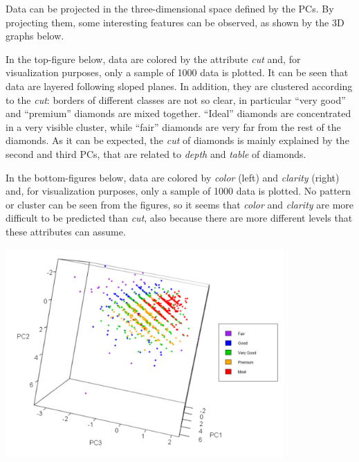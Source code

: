 \documentclass[
]{article}
\begin{document}
Data can be projected in the three-dimensional space defined by the PCs.
By projecting them, some interesting features can be observed, as shown
by the 3D graphs below.

\newpage

In the top-figure below, data are colored by the attribute \emph{cut}
and, for visualization purposes, only a sample of 1000 data is plotted.
It can be seen that data are layered following sloped planes. In
addition, they are clustered according to the \emph{cut}: borders of
different classes are not so clear, in particular ``very good'' and
``premium'' diamonds are mixed together. ``Ideal'' diamonds are
concentrated in a very visible cluster, while ``fair'' diamonds are very
far from the rest of the diamonds. As it can be expected, the \emph{cut}
of diamonds is mainly explained by the second and third PCs, that are
related to \emph{depth} and \emph{table} of diamonds.

In the bottom-figures below, data are colored by \emph{color} (left) and
\emph{clarity} (right) and, for visualization purposes, only a sample of
1000 data is plotted. No pattern or cluster can be seen from the
figures, so it seems that \emph{color} and \emph{clarity} are more
difficult to be predicted than \emph{cut}, also because there are more
different levels that these attributes can assume.

\includegraphics[width=0.8\textwidth,height=\textheight]{Images/PC_Image.png}
\end{document}

